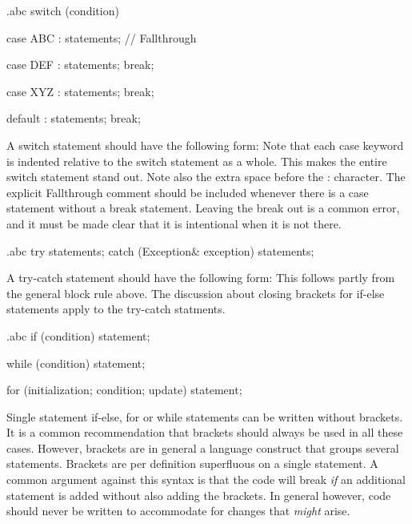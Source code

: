 \begin{filecontents*}{\jobname.abc}
	switch (condition) {
	    case ABC :
		    statements;
		    // Fallthrough
		
	    case DEF :
		    statements;
		    break;
		
	    case XYZ :
		    statements;
		    break;
		
	    default :
		    statements;
		    break;
	}
\end{filecontents*}

\recommendation
{A switch statement should have the following form:}
{}
{Note that each case keyword is indented relative to the switch statement as a whole. This makes the entire switch statement stand out. Note also the extra space before the : character. The explicit Fallthrough comment should be included whenever there is a case statement without a break statement. Leaving the break out is a common error, and it must be made clear that it is intentional when it is not there.}


\begin{filecontents*}{\jobname.abc}
	try {
	   statements;
	}
	catch (Exception& exception) {
	    statements;
	}
\end{filecontents*}

\recommendation
{A try-catch statement should have the following form:}
{}
{This follows partly from the general block rule above. The discussion about closing brackets for if-else statements apply to the try-catch statments.}


\begin{filecontents*}{\jobname.abc}
	if (condition)
	    statement;
	
	while (condition)
	    statement;
	
	for (initialization; condition; update)
	    statement;
\end{filecontents*}

\recommendation
{Single statement if-else, for or while statements can be written without brackets.}
{}
{It is a common recommendation that brackets should always be used in all these cases. However, brackets are in general a language construct that groups several statements. Brackets are per definition superfluous on a single statement. A common argument against this syntax is that the code will break \textit{if} an additional statement is added without also adding the brackets. In general however, code should never be written to accommodate for changes that \textit{might} arise.}



